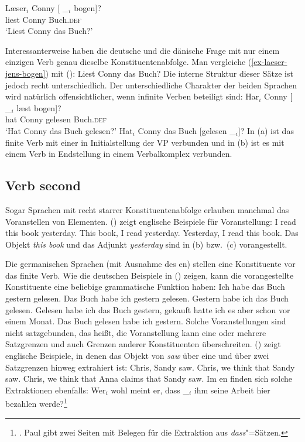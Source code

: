 \ex
\gll Læser$_i$ Conny [ \_$_i$ bogen]?\\
     liest     Conny {}        {}     Buch.\textsc{def}\\
\glt `Liest Conny das Buch?'
\zl

\noindent
Interessanterweise haben die deutsche und die dänische Frage mit nur einem einzigen Verb genau
dieselbe Konstituentenabfolge. Man vergleiche (\ref{ex-laeser-jens-bogen}) mit ():
\ea
Liest Conny das Buch?
\z
Die interne Struktur dieser Sätze ist jedoch recht unterschiedlich. Der unterschiedliche Charakter der beiden
Sprachen wird natürlich offensichtlicher, wenn infinite Verben beteiligt sind:
\eal
\ex
\gll Har$_i$ Conny [ \_$_i$ læst bogen]?\\
     hat Conny {} {} gelesen Buch.\textsc{def}\\\danish
\glt `Hat Conny das Buch gelesen?'
\ex
Hat$_i$ Conny das Buch [gelesen \_$_i$]?
\zl
In (a) ist das finite Verb mit einer  in Initialstellung der VP verbunden und in
(b) ist es mit einem Verb in Endstellung in einem Verbalkomplex verbunden.%

\subsection{Verb second}
\label{sec-verb-second}

Sogar Sprachen mit recht starrer Konstituentenabfolge erlauben manchmal das Voranstellen von Elementen.
() zeigt englische Beispiele für Voranstellung:
\eal
\ex I read this book yesterday.
\ex This book, I read yesterday.
\ex Yesterday, I read this book.
\zl
Das Objekt \emph{this book} und das Adjunkt \emph{yesterday} sind in (b) bzw.\
(c) vorangestellt.

Die germanischen Sprachen (mit Ausnahme des en) stellen eine Konstituente vor das finite
Verb. Wie die deutschen\il{Deutsch} Beispiele in (\mex{1}) zeigen, kann die vorangestellte Konstituente eine beliebige grammatische Funktion haben:
\eal
\ex 
Ich habe das Buch gestern gelesen.
\ex 
Das Buch habe ich gestern gelesen.
\ex 
Gestern habe ich das Buch gelesen.
\ex 
Gelesen habe ich das Buch gestern, gekauft hatte ich es aber schon vor einem Monat.
\ex 
Das Buch gelesen habe ich gestern.
\zl
Solche Voranstellungen sind nicht satzgebunden, das heißt, die Voranstellung kann eine oder mehrere Satzgrenzen
und auch Grenzen anderer Konstituenten überschreiten. (\mex{1}) zeigt englische\il{Englisch} Beispiele, in denen das Objekt von
\emph{saw} über eine und über zwei Satzgrenzen hinweg extrahiert ist:
\eal
\ex\label{ex-chris-we-saw} Chris, Sandy saw.
\ex\label{ex-chris-we-think-that-sandy-saw} Chris, we think that Sandy saw.
\ex Chris, we think that Anna claims that Sandy saw.
\zl
Im en finden sich solche Extraktionen ebenfalls:
\eal
\label{ex-fernabhaengigkeit-one}
\ex 
 Wer$_i$ wohl    meint   er, dass \_$_i$ ihm seine Arbeit hier bezahlen werde?\footnote{
\citew[\page 321]{Paul1919a}. Paul gibt zwei Seiten mit Belegen für die Extraktion aus \emph{dass}"=Sätzen.
}

